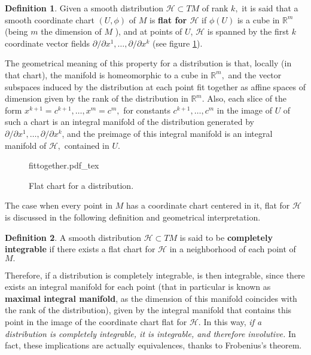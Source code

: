 \documentclass[12pt, letterpaper, reqno]{amsart}
\newcommand{\incfig}[2][1]{%
    \def\svgwidth{#1\columnwidth}
    {#2.pdf_tex}
}
\theoremstyle{definition}
\newtheorem{df}{Definition}
\theoremstyle{plain}
\theoremstyle{remark}
\begin{document}
\begin{df}
	Given a smooth distribution $ \mathcal{H}\subset TM $  of rank $ k, $ it is said that a smooth coordinate chart $ (U,\phi) $ of $ M $ is \textbf{flat for $ \mathcal{H} $ } if $ \phi(U) $ is a cube in $ \mathbb{R}^m  $ (being $ m $ the dimension of $ M $ ), and at points of $ U $, $ \mathcal{H} $ is spanned by the first $ k $ coordinate vector fields $ \partial/\partial x^1,\dots,\partial/\partial x^k $ (see figure \ref{fig:fittogether}).
\end{df}
The geometrical meaning of this property for a distribution is that, locally (in that chart), the manifold is homeomorphic to a cube in $ \mathbb{R}^m,  $ and the vector subspaces induced by the distribution at each point fit together as affine spaces of dimension given by the rank of the distribution in $ \mathbb{R}^m $. Also, each slice of the form $ x^{k+1}=c^{k+1},\dots, x^m=c^m,$ for constants $ c^{k+1}, \dots, c^m $ in the image of $ U $ of such a chart is an integral manifold of the distribution generated by $ \partial/\partial x^1,\dots,\partial/\partial x^k $, and the preimage of this integral manifold is an integral manifold of $ \mathcal{H}, $ contained in $ U. $  

\begin{figure}
    \centering
    \incfig{fittogether}
    \caption{Flat chart for a distribution.}
    \label{fig:fittogether}
\end{figure}

The case when every point in $ M $ has a coordinate chart centered in it, flat for $ \mathcal{H} $ is discussed in the following definition and geometrical interpretation.

\begin{df}
	A smooth distribution $ \mathcal{H}\subset TM $  is said to be \textbf{completely integrable} if there exists a flat chart for $ \mathcal{H} $ in a neighborhood of each point of $ M. $ 
\end{df}

Therefore, if a distribution is completely integrable, is then integrable, since there exists an integral manifold for each point (that in particular is known as \textbf{maximal integral manifold}, as the dimension of this manifold coincides with the rank of the distribution), given by the integral manifold that contains this point in the image of the coordinate chart flat for $ \mathcal{H}. $ In this way, \textit{ if a distribution is completely integrable, it is integrable, and therefore involutive.} In fact, these implications are actually equivalences, thanks to Frobenius's theorem.
\end{document}
